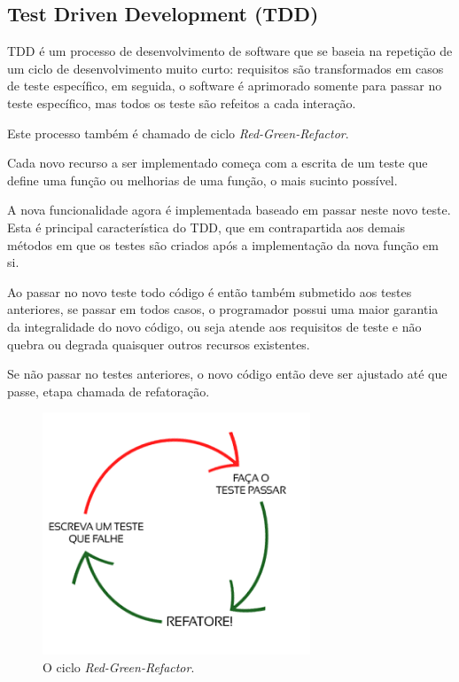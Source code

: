 \subsection{Test Driven Development (TDD)}
\par TDD é um processo de desenvolvimento de software que se baseia na repetição de um ciclo de desenvolvimento muito curto: requisitos são transformados em casos de teste específico, em seguida, o software é aprimorado somente para passar no teste específico, mas todos os teste são refeitos a cada interação. 
\par Este processo também é chamado de ciclo \emph{Red-Green-Refactor}.
\par Cada novo recurso a ser implementado começa com a escrita de um teste que define uma função ou melhorias de uma função, o mais sucinto possível. 
\par A nova funcionalidade agora é implementada baseado em passar neste novo teste. Esta é principal característica do TDD, que em contrapartida aos demais métodos em que os testes são criados após a implementação da nova função em si. 
\par Ao passar no novo teste todo código é então também submetido aos testes anteriores, se passar em todos casos, o programador possui uma maior garantia da integralidade do novo código, ou seja atende aos requisitos de teste e não quebra ou degrada quaisquer outros recursos existentes. 
\par Se não passar no testes anteriores, o novo código então deve ser ajustado até que passe, etapa chamada de refatoração.
\begin{figure}[!htb]
\centering
\includegraphics[width=8cm]{figuras/red_green}
\caption{\label{fig:red_green}O ciclo \emph{Red-Green-Refactor}.}
\end{figure}
